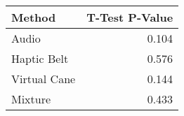 
\centering
\begin{tabular}{lr}
\toprule
      Method &  T-Test P-Value \\
\midrule
       Audio &           0.104 \\
 Haptic Belt &           0.576 \\
Virtual Cane &           0.144 \\
     Mixture &           0.433 \\
\bottomrule
\end{tabular}
